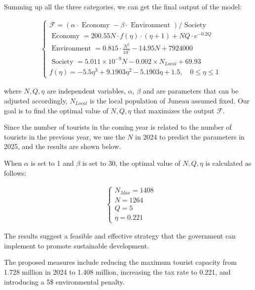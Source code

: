 Summing up all the three categories, we can get the final output of the model:

\begin{equation}
    \begin{aligned}
    &\left\{\begin{array}{l}
    \mathcal{F}=(\alpha \cdot \text { Economy }-\beta \cdot \text { Environment }) / \text { Society } \\[10pt]
    \text { Economy }=200.55 N \cdot f(\eta) \cdot (\eta+1)+NQ\cdot e^{-0.2 Q} \\[10pt]
    \text { Environment }=0.815 \cdot \frac{N^2}{10^5}-14.95 N+7924000 \\[10pt]
    \text { Society }=5.011\times 10^{-9} N -0.002 \times N_{Local}+69.93 \\[10pt]
    f(\eta)=-5.5 \eta^3+9.1903 \eta^2-5.1903 \eta+1.5, \quad 0 \leq \eta \leq 1
    \end{array}\right.
    \end{aligned}
\end{equation}

where $N,Q,\eta$ are independent variables, $\alpha$, $\beta$ 
and are parameters that can be adjusted accordingly, 
$N_{Local}$ is the local population of Juneau assumed fixed.
Our goal is to find the optimal value of $N,Q,\eta$ that maximizes the output $\mathcal{F}$.

Since the number of tourists in the coming year is related to the number of tourists in the previous year, 
we use the $N$ in 2024 to predict the parameters in 2025, and the results are shown below.

When $\alpha$ is set to 1 and $\beta$ is set to 30, 
the optimal value of $N,Q,\eta$ is calculated as follows:

\begin{equation}
    \begin{aligned}
    &\left\{\begin{array}{l}
    N_{Max} = 1408 \\[10pt]
    N=1264 \\[10pt]
    Q=5 \\[10pt]
    \eta=0.221
    \end{array}\right.
    \end{aligned}
\end{equation}

The results suggest a feasible and effective strategy that the government can implement to promote sustainable development. 

The proposed measures include reducing the maximum tourist capacity from 1.728 million in 2024 to 1.408 million, increasing the tax rate to 0.221, and introducing a 5\$ environmental penalty. 

